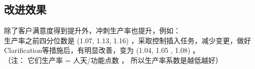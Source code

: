 \hypertarget{ux6539ux8fdbux6548ux679c}{%
\subsection{改进效果}\label{ux6539ux8fdbux6548ux679c}}

除了客户满意度得到提升外，冲刺生产率也提升，例如：\\
生产率之前四分位数是 (1.07, 1.13, 1.16)
，采取控制插入任务，减少变更，做好Clarification等措施后，有明显改善，变为
(1.04, 1.05 , 1.08) 。\\
（注： 它们生产率 = 人天/功能点数 ， 所以生产率系数是越低越好）

